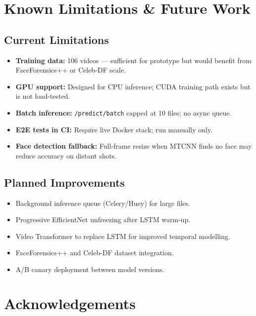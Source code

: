 \documentclass[conference]{IEEEtran}
\begin{document}
\section{Known Limitations \& Future Work}
\label{sec:future}

\subsection{Current Limitations}

\begin{itemize}[noitemsep]
  \item \textbf{Training data:} 106 videos — sufficient for prototype but would benefit from FaceForensics++ or Celeb-DF scale.
  \item \textbf{GPU support:} Designed for CPU inference; CUDA training path exists but is not load-tested.
  \item \textbf{Batch inference:} \texttt{/predict/batch} capped at 10 files; no async queue.
  \item \textbf{E2E tests in CI:} Require live Docker stack; run manually only.
  \item \textbf{Face detection fallback:} Full-frame resize when MTCNN finds no face may reduce accuracy on distant shots.
\end{itemize}

\subsection{Planned Improvements}

\begin{itemize}[noitemsep]
  \item Background inference queue (Celery/Huey) for large files.
  \item Progressive EfficientNet unfreezing after LSTM warm-up.
  \item Video Transformer to replace LSTM for improved temporal modelling.
  \item FaceForensics++ and Celeb-DF dataset integration.
  \item A/B canary deployment between model versions.
\end{itemize}

\section*{Acknowledgements}
\end{document}
